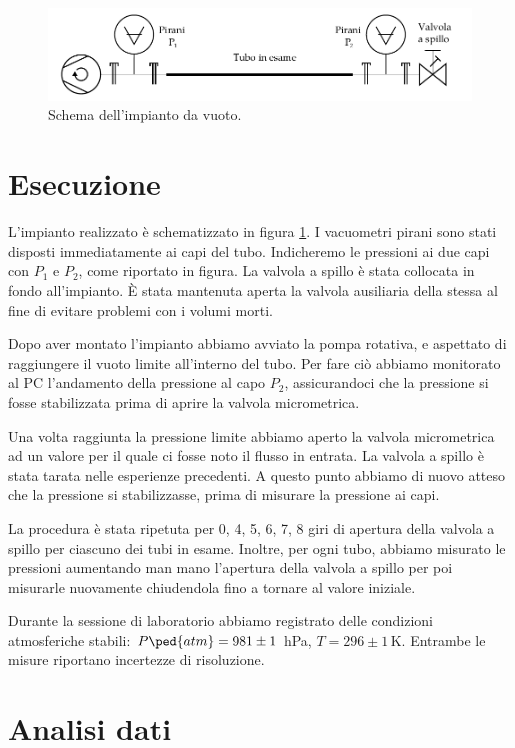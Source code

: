 \begin{figure}[b]
    \includegraphics[width=160mm]{drawing.pdf}
    \caption{Schema dell'impianto da vuoto.}
    \label{fig:schema}
\end{figure}

\section{Esecuzione}

L'impianto realizzato è schematizzato in figura \ref{fig:schema}. I vacuometri pirani sono stati disposti
immediatamente ai capi del tubo. Indicheremo le pressioni ai due capi con $P_1$ e $P_2$, come riportato in figura.
La valvola a spillo è stata collocata in fondo all'impianto. È stata mantenuta
aperta la valvola ausiliaria della stessa al fine di evitare problemi con i volumi morti. 

Dopo aver montato l'impianto abbiamo avviato la pompa rotativa, e aspettato di raggiungere il vuoto limite all'interno
del tubo. Per fare ciò abbiamo monitorato al PC l'andamento della pressione al capo $P_2$, assicurandoci che la pressione
si fosse stabilizzata prima di aprire la valvola micrometrica.

Una volta raggiunta la pressione limite abbiamo aperto la valvola micrometrica ad un valore per il quale ci fosse noto
il flusso in entrata. La valvola a spillo è stata tarata nelle esperienze precedenti. A questo punto abbiamo di nuovo
atteso che la pressione si stabilizzasse, prima di misurare la pressione ai capi. 

La procedura è stata ripetuta per 0, 4, 5, 6, 7, 8 giri di apertura della valvola a spillo per ciascuno dei
tubi in esame. Inoltre, per ogni tubo, abbiamo misurato le pressioni aumentando man mano l'apertura della valvola
a spillo per poi misurarle nuovamente chiudendola fino a tornare al valore iniziale.

Durante la sessione di laboratorio abbiamo registrato delle condizioni atmosferiche stabili: $P\ped{atm} = 981 \pm 1$ hPa,
$T = 296 \pm 1 \, \si{\kelvin}$. Entrambe le misure riportano incertezze di risoluzione.

\section{Analisi dati}

